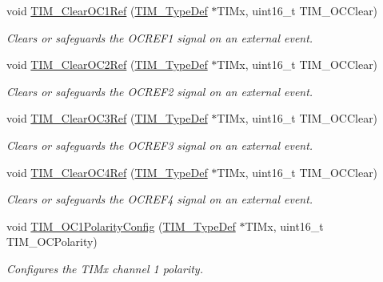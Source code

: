 \begin{DoxyCompactItemize}
void \mbox{\hyperlink{group___t_i_m___private___functions_ga34e926cd8a99cfcc7480b2d6de5118b6}{T\+I\+M\+\_\+\+Clear\+O\+C1\+Ref}} (\mbox{\hyperlink{struct_t_i_m___type_def}{T\+I\+M\+\_\+\+Type\+Def}} $\ast$T\+I\+Mx, uint16\+\_\+t T\+I\+M\+\_\+\+O\+C\+Clear)
\begin{DoxyCompactList}\small\item\em Clears or safeguards the O\+C\+R\+E\+F1 signal on an external event. \end{DoxyCompactList}\item 
void \mbox{\hyperlink{group___t_i_m___private___functions_gac474ebc815d24c8a589969e0c68b27b0}{T\+I\+M\+\_\+\+Clear\+O\+C2\+Ref}} (\mbox{\hyperlink{struct_t_i_m___type_def}{T\+I\+M\+\_\+\+Type\+Def}} $\ast$T\+I\+Mx, uint16\+\_\+t T\+I\+M\+\_\+\+O\+C\+Clear)
\begin{DoxyCompactList}\small\item\em Clears or safeguards the O\+C\+R\+E\+F2 signal on an external event. \end{DoxyCompactList}\item 
void \mbox{\hyperlink{group___t_i_m___private___functions_ga0bd9476a14bd346c319945ec4fa2bc67}{T\+I\+M\+\_\+\+Clear\+O\+C3\+Ref}} (\mbox{\hyperlink{struct_t_i_m___type_def}{T\+I\+M\+\_\+\+Type\+Def}} $\ast$T\+I\+Mx, uint16\+\_\+t T\+I\+M\+\_\+\+O\+C\+Clear)
\begin{DoxyCompactList}\small\item\em Clears or safeguards the O\+C\+R\+E\+F3 signal on an external event. \end{DoxyCompactList}\item 
void \mbox{\hyperlink{group___t_i_m___private___functions_gaeee5fa66b26e7c6f71850272dc3028f3}{T\+I\+M\+\_\+\+Clear\+O\+C4\+Ref}} (\mbox{\hyperlink{struct_t_i_m___type_def}{T\+I\+M\+\_\+\+Type\+Def}} $\ast$T\+I\+Mx, uint16\+\_\+t T\+I\+M\+\_\+\+O\+C\+Clear)
\begin{DoxyCompactList}\small\item\em Clears or safeguards the O\+C\+R\+E\+F4 signal on an external event. \end{DoxyCompactList}\item 
void \mbox{\hyperlink{group___t_i_m___private___functions_ga03878f78163485c8a3508cff2111c297}{T\+I\+M\+\_\+\+O\+C1\+Polarity\+Config}} (\mbox{\hyperlink{struct_t_i_m___type_def}{T\+I\+M\+\_\+\+Type\+Def}} $\ast$T\+I\+Mx, uint16\+\_\+t T\+I\+M\+\_\+\+O\+C\+Polarity)
\begin{DoxyCompactList}\small\item\em Configures the T\+I\+Mx channel 1 polarity. \end{DoxyCompactList}\item 

\end{DoxyCompactItemize}
